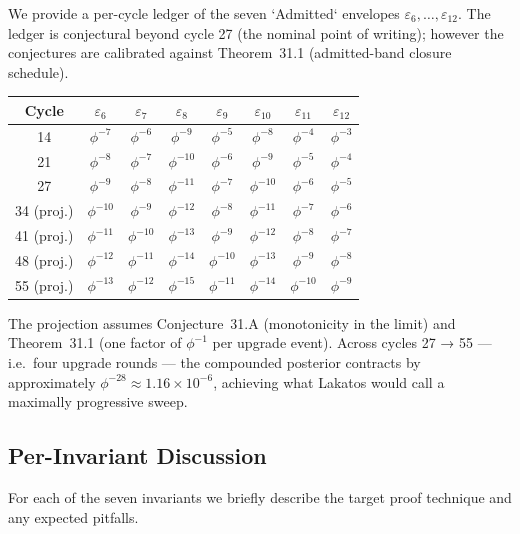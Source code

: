 We provide a per-cycle ledger of the seven `Admitted` envelopes $\varepsilon_{6}, \dots, \varepsilon_{12}$. The ledger is conjectural beyond cycle 27 (the nominal point of writing); however the conjectures are calibrated against Theorem~31.1 (admitted-band closure schedule).

\begin{center}
\begin{tabular}{|c|c|c|c|c|c|c|c|}
\hline
\textbf{Cycle} & $\varepsilon_{6}$ & $\varepsilon_{7}$ & $\varepsilon_{8}$ & $\varepsilon_{9}$ & $\varepsilon_{10}$ & $\varepsilon_{11}$ & $\varepsilon_{12}$ \\
\hline
14 & $\phi^{-7}$ & $\phi^{-6}$ & $\phi^{-9}$ & $\phi^{-5}$ & $\phi^{-8}$ & $\phi^{-4}$ & $\phi^{-3}$ \\
21 & $\phi^{-8}$ & $\phi^{-7}$ & $\phi^{-10}$ & $\phi^{-6}$ & $\phi^{-9}$ & $\phi^{-5}$ & $\phi^{-4}$ \\
27 & $\phi^{-9}$ & $\phi^{-8}$ & $\phi^{-11}$ & $\phi^{-7}$ & $\phi^{-10}$ & $\phi^{-6}$ & $\phi^{-5}$ \\
34 (proj.) & $\phi^{-10}$ & $\phi^{-9}$ & $\phi^{-12}$ & $\phi^{-8}$ & $\phi^{-11}$ & $\phi^{-7}$ & $\phi^{-6}$ \\
41 (proj.) & $\phi^{-11}$ & $\phi^{-10}$ & $\phi^{-13}$ & $\phi^{-9}$ & $\phi^{-12}$ & $\phi^{-8}$ & $\phi^{-7}$ \\
48 (proj.) & $\phi^{-12}$ & $\phi^{-11}$ & $\phi^{-14}$ & $\phi^{-10}$ & $\phi^{-13}$ & $\phi^{-9}$ & $\phi^{-8}$ \\
55 (proj.) & $\phi^{-13}$ & $\phi^{-12}$ & $\phi^{-15}$ & $\phi^{-11}$ & $\phi^{-14}$ & $\phi^{-10}$ & $\phi^{-9}$ \\
\hline
\end{tabular}
\end{center}

The projection assumes Conjecture~31.A (monotonicity in the limit) and Theorem~31.1 (one factor of $\phi^{-1}$ per upgrade event). Across cycles 27 → 55 — i.e.\ four upgrade rounds — the compounded posterior contracts by approximately $\phi^{-28} \approx 1.16 \times 10^{-6}$, achieving what Lakatos would call a maximally progressive sweep.

\subsection{Per-Invariant Discussion}
\label{sec:31-per-inv-discussion}

For each of the seven invariants we briefly describe the target proof technique and any expected pitfalls.

